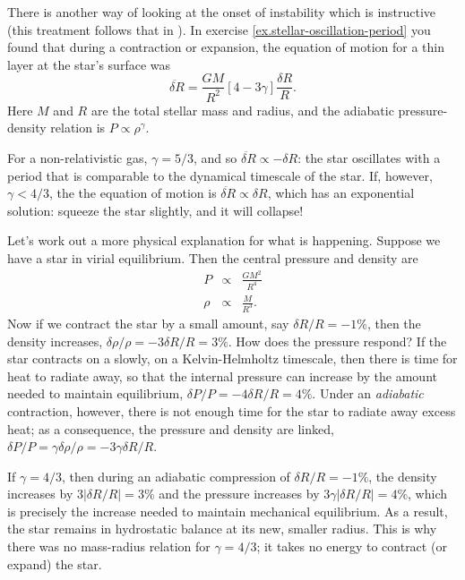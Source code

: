 \begin{sidebar}
There is another way of looking at the onset of instability which is instructive (this treatment follows that in \citet{Cox1980Theory-of-Stell}). In exercise \ref{ex.stellar-oscillation-period} you found that during a contraction or expansion, the equation of motion for a thin layer at the star's surface was
\[
	\ddot{\delta R} = \frac{GM}{R^{2}}\left[4-3\gamma\right]\frac{\delta R}{R}.
\]
Here $M$ and $R$ are the total stellar mass and radius, and the adiabatic pressure-density relation is $P\propto \rho^{\gamma}$.

For a non-relativistic gas, $\gamma = 5/3$, and so $\ddot{\delta R} \propto -\delta R$: the star oscillates with a period that is comparable to the dynamical timescale of the star. If, however, $\gamma < 4/3$, the the equation of motion is $\ddot{\delta R} \propto \delta R$, which has an exponential solution: squeeze the star slightly, and it will collapse!

Let's work out a more physical explanation for what is happening. Suppose we have a star in virial equilibrium. Then the central pressure and density are
\begin{eqnarray*}
P &\propto& \frac{GM^{2}}{R^{4}} \\
\rho &\propto& \frac{M}{R^{3}}.
\end{eqnarray*}
Now if we contract the star by a small amount, say $\delta R/R = -1\%$, then the density increases, $\delta\rho/\rho = -3\delta R/R = 3\%$. How does the pressure respond? If the star contracts on a slowly, on a Kelvin-Helmholtz timescale, then there is time for heat to radiate away, so that the internal pressure can increase by the amount needed to maintain equilibrium, $\delta P/P = -4\delta R/R = 4\%$. Under an \emph{adiabatic} contraction, however, there is not enough time for the star to radiate away excess heat; as a consequence, the pressure and density are linked, $\delta P/P = \gamma\delta \rho/\rho = -3\gamma\delta R/R$.

If $\gamma = 4/3$, then during an adiabatic compression of $\delta R/R = -1\%$, the density increases by $3|\delta R/R| = 3\%$ and the pressure increases by $3\gamma|\delta R/R| = 4\%$, which is precisely the increase needed to maintain mechanical equilibrium. As a result, the star remains in hydrostatic balance at its new, smaller radius. This is why there was no mass-radius relation for $\gamma = 4/3$; it takes no energy to contract (or expand) the star.


\end{sidebar}
